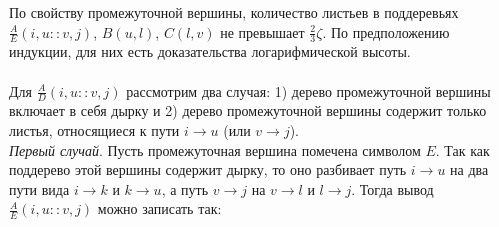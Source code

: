 \documentclass{spbau-diploma}
\begin{document}
По свойству промежуточной вершины, количество листьев в поддеревьях $\frac{A}{E}(i , u :: v , j)$, $B(u, l)$, $C(l, v)$ не превышает $\frac{2}{3}\zeta$. По предположению индукции, для них есть доказательства логарифмической высоты.
\\
\\Для  $\frac{A}{D}(i , u :: v , j)$ рассмотрим два случая: 1) дерево промежуточной вершины включает в себя дырку и 2) дерево промежуточной вершины содержит только листья, относящиеся к пути $i \rightarrow u$ (или $v \rightarrow j$).
\\\textit{Первый случай}. Пусть промежуточная вершина помечена символом $E$. Так как поддерево этой вершины содержит дырку, то оно разбивает путь  $i \rightarrow u$ на два пути вида  $i \rightarrow k$ и  $k \rightarrow u$, а путь $v \rightarrow j$ на  $v \rightarrow l$ и  $l \rightarrow j$.
Тогда вывод  $\frac{A}{E}(i , u :: v , j)$ можно записать так:
\begin{prooftree}
\end{prooftree}
\end{document}
